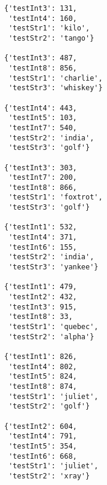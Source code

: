 \begin{lstlisting}
{'testInt3': 131,
 'testInt4': 160,
 'testStr1': 'kilo',
 'testStr2': 'tango'}

{'testInt3': 487,
 'testInt8': 856,
 'testStr1': 'charlie',
 'testStr3': 'whiskey'}

{'testInt4': 443,
 'testInt5': 103,
 'testInt7': 540,
 'testStr2': 'india',
 'testStr3': 'golf'}

{'testInt3': 303,
 'testInt7': 200,
 'testInt8': 866,
 'testStr1': 'foxtrot',
 'testStr3': 'golf'}

{'testInt1': 532,
 'testInt4': 371,
 'testInt6': 155,
 'testStr2': 'india',
 'testStr3': 'yankee'}

{'testInt1': 479,
 'testInt2': 432,
 'testInt3': 915,
 'testInt8': 33,
 'testStr1': 'quebec',
 'testStr2': 'alpha'}

{'testInt1': 826,
 'testInt4': 802,
 'testInt5': 824,
 'testInt8': 874,
 'testStr1': 'juliet',
 'testStr2': 'golf'}

{'testInt2': 604,
 'testInt4': 791,
 'testInt5': 354,
 'testInt6': 668,
 'testStr1': 'juliet',
 'testStr2': 'xray'}

\end{lstlisting}

